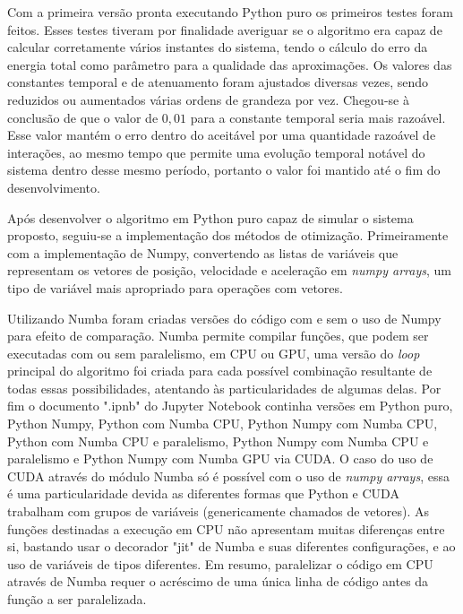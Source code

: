 \documentclass[
	12pt,				%
	a4paper,			%
	english,			%
	openright,				%
	brazil,				%
	oneside]{abntex2}
\begin{document}
	Com a primeira versão pronta executando Python puro os primeiros testes foram feitos. Esses testes tiveram por finalidade averiguar se o algoritmo era capaz de calcular corretamente vários instantes do sistema, tendo o cálculo do erro da energia total como parâmetro para a qualidade das aproximações. Os valores das constantes temporal e de atenuamento foram ajustados diversas vezes, sendo reduzidos ou aumentados várias ordens de grandeza por vez. Chegou-se à conclusão de que o valor de $0,01$ para a constante temporal seria mais razoável. Esse valor mantém o erro dentro do aceitável por uma quantidade razoável de interações, ao mesmo tempo que permite uma evolução temporal notável do sistema dentro desse mesmo período, portanto o valor foi mantido até o fim do desenvolvimento.
	
	Após desenvolver o algoritmo em Python puro capaz de simular o sistema proposto, seguiu-se a implementação dos métodos de otimização. Primeiramente com a implementação de Numpy, convertendo as listas de variáveis que representam os vetores de posição, velocidade e aceleração em \textit{numpy arrays}, um tipo de variável mais apropriado para operações com vetores. 
	
	Utilizando Numba foram criadas versões do código com e sem o uso de Numpy para efeito de comparação. Numba permite compilar funções, que podem ser executadas com ou sem paralelismo, em CPU ou GPU, uma versão do \textit{loop} principal do algoritmo foi criada para cada possível combinação resultante de todas essas possibilidades, atentando às particularidades de algumas delas. Por fim o documento ".ipnb" do Jupyter Notebook continha versões em Python puro, Python Numpy, Python com Numba CPU, Python Numpy com Numba CPU, Python com Numba CPU e paralelismo, Python Numpy com Numba CPU e paralelismo e Python Numpy com Numba GPU via CUDA. O caso do uso de CUDA através do módulo Numba só é possível com o uso de \textit{numpy arrays}, essa é uma particularidade devida as diferentes formas que Python e CUDA trabalham com grupos de variáveis (genericamente chamados de vetores).
	As funções destinadas a execução em CPU não apresentam muitas diferenças entre si, bastando usar o decorador "jit" de Numba e suas diferentes configurações, e ao uso de variáveis de tipos diferentes. Em resumo, paralelizar o código em CPU através de Numba requer o acréscimo de uma única linha de código antes da função a ser paralelizada.
	
	\inputminted[fontsize=\footnotesize]{python}{nbody_codefrac3.py}
	
\end{document}
